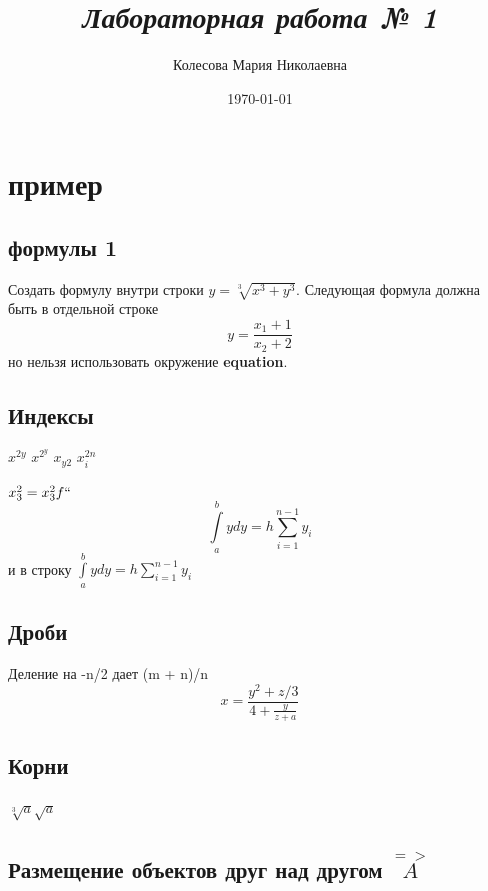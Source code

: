 \documentclass{article}
\title{\textit{Лабораторная работа № 1}}
\author{Колесова Мария Николаевна}
\date{\today}
\begin{document}
\maketitle
\section{пример}
\subsection{формулы 1}
Создать формулу внутри строки $y = \sqrt[3]{x^3 + y^3}$. Следующая формула должна быть в отдельной строке $$y = \frac{x_1 + 1}{x_2 + 2}$$ но нельзя использовать окружение \textbf{equation}.

\vspace{\baselineskip}
\subsection*{Индексы}
\vspace{\baselineskip}

$x^{2y}$ $x^{2^{y}}$ $x_{y2}$ $x^{2n}_i$

$x^2_3 = x^2_3f``$
$$\int\limits_a^b ydy = h\sum_{i=1}^{n-1}y_i$$ и в строку $\int\limits_a^b ydy = h\sum_{i=1}^{n-1}y_i$

\vspace{\baselineskip}
\subsection*{Дроби}
\vspace{\baselineskip}

Деление на -n/2 дает (m + n)/n $$x = \frac{y^2 + z/3}{4 + \frac{y}{z + a}}$$

\vspace{\baselineskip}
\subsection*{Корни}
\vspace{\baselineskip}

$\sqrt[3]a\sqrt{a}$

\vspace{\baselineskip}
\subsection*{Размещение объектов друг над другом $\stackrel{=>}{A}$}
\vspace{\baselineskip}
\end{document}
